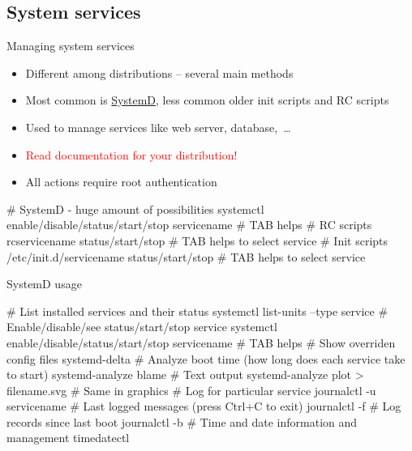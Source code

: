 \documentclass[compress, ucs, xelatex, 11pt, xcolor=svgnames,
  hyperref={
    bookmarks=true,
    unicode=true,
    colorlinks=true,
    pdftitle={Linux, command line and MetaCentrum},
    plainpages=false,
    pdfauthor={Vojtech Zeisek},
    pdfsubject={Course about use of Linux command line, writing shell scripts and using MetaCentrum of CESNET},
    pdfcreator={XeLaTeX},
    pdfkeywords={Linux, GNU, BASH, shell, command line, MetaCentrum},
    linkcolor=Red,
    anchorcolor=Blue,
    citecolor=Purple,
    filecolor=DodgerBlue,
    menucolor=DarkOrchid,
    urlcolor=DeepSkyBlue,
    pdftex},
  url={hyphens, lowtilde} %
  ]{beamer}
\renewcommand{\alert}[1]{\textcolor{red}{#1}}
\begin{document}

\subsection{System services}

\begin{frame}[fragile]{Managing system services}
\begin{itemize}
  \item Different among distributions -- several main methods
  \item Most common is \href{https://wiki.freedesktop.org/www/Software/systemd/}{SystemD}, less common older init scripts and RC scripts
  \item Used to manage services like web server, database,~\ldots
  \item \alert{Read documentation for your distribution!}
  \item All actions require root authentication
\end{itemize}
  \begin{bashcode}
    # SystemD - huge amount of possibilities
    systemctl enable/disable/status/start/stop servicename # TAB helps
    # RC scripts
    rcservicename status/start/stop # TAB helps to select service
    # Init scripts
    /etc/init.d/servicename status/start/stop # TAB helps to select service
  \end{bashcode}
\end{frame}

\begin{frame}[fragile]{SystemD usage}
  \begin{bashcode}
    # List installed services and their status
    systemctl list-units --type service
    # Enable/disable/see status/start/stop service
    systemctl enable/disable/status/start/stop servicename # TAB helps
    # Show overriden config files
    systemd-delta
    # Analyze boot time (how long does each service take to start)
    systemd-analyze blame # Text output
    systemd-analyze plot > filename.svg # Same in graphics
    # Log for particular service
    journalctl -u servicename
    # Last logged messages (press Ctrl+C to exit)
    journalctl -f
    # Log records since last boot
    journalctl -b
    # Time and date information and management
    timedatectl
  \end{bashcode}
\end{frame}
\end{document}
